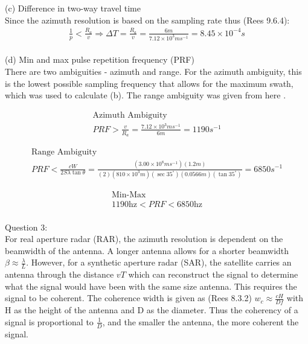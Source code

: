 \documentclass{homework}
\begin{document}
(c) Difference in two-way travel time \\

Since the azimuth resolution is based on the sampling rate thus (Rees 9.6.4):
\begin{gather*}
    \frac{1}{p} < \frac{R_a}{v} \Rightarrow \Delta T = \frac{R_a}{v} = \frac{6m}{7.12 \times 10^3 ms^{-1}} 
    = 8.45 \times 10^{-4}s
\end{gather*} \\

(d) Min and max pulse repetition frequency (PRF)\\

There are two ambiguities - azimuth and range. For the azimuth ambiguity, this is the lowest possible sampling frequency that allows for the maximum swath, which was used to calculate (b). The range ambiguity was given from here \cite{SAR}. 

\begin{gather*}
    \text{Azimuth Ambiguity}\\
    PRF > \frac{v}{R_a} = \frac{7.12 \times 10^3 ms^{-1}}{6m} = 1190s^{-1}
\end{gather*}

\begin{gather*}
    \text{Range Ambiguity} \\
    PRF < \frac{cW}{2 S \lambda \tan \theta} = \frac{(3.00 \times 10^8 ms^{-1})(1.2m)}{(2)(810 \times 10^3m)(\sec 35^\circ)(0.0566m)(\tan 35^\circ)} 
    = 6850s^{-1}
\end{gather*}

\begin{gather*}
    \text{Min-Max}\\
    1190\text{hz} < PRF < 6850\text{hz}
\end{gather*} \\

Question 3: \\

For real aperture radar (RAR), the azimuth resolution is dependent on the beamwidth of the antenna. A longer antenna allows for a shorter beamwidth $\beta \approx \frac{\lambda}{L}$. However, for a synthetic aperture radar (SAR), the satellite carries an antenna through the distance $vT$ which can reconstruct the signal to determine what the signal would have been with the same size antenna. This requires the signal to be coherent. The coherence width is given as (Rees 8.3.2) $w_c \approx \frac{cH}{Df}$ with H as the height of the antenna and D as the diameter. Thus the coherency of a signal is proportional to $\frac{1}{D}$, and the smaller the antenna, the more coherent the signal. \\
\end{document}
